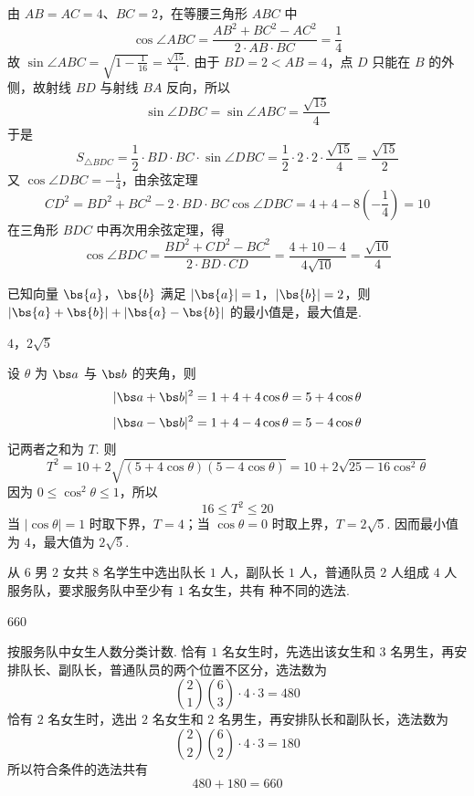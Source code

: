 \begin{solution}
由 \(AB=AC=4\)、\(BC=2\)，在等腰三角形 \(ABC\) 中
\[
\cos\angle ABC=\frac{AB^2+BC^2-AC^2}{2\cdot AB\cdot BC}=\frac14
\]
故 \(\sin\angle ABC=\sqrt{1-\frac{1}{16}}=\frac{\sqrt{15}}{4}\). 由于 \(BD=2<AB=4\)，点 \(D\) 只能在 \(B\) 的外侧，故射线 \(BD\) 与射线 \(BA\) 反向，所以
\[
\sin\angle DBC=\sin\angle ABC=\frac{\sqrt{15}}4
\]
于是
\[
S_{\triangle BDC}=\frac12\cdot BD\cdot BC\cdot\sin\angle DBC
=\frac12\cdot2\cdot2\cdot\frac{\sqrt{15}}4=\frac{\sqrt{15}}2
\]
又 \(\cos\angle DBC=-\frac{1}{4}\)，由余弦定理
\[
CD^2=BD^2+BC^2-2\cdot BD\cdot BC\cos\angle DBC
=4+4-8\left(-\frac14\right)=10
\]
在三角形 \(BDC\) 中再次用余弦定理，得
\[
\cos\angle BDC=\frac{BD^2+CD^2-BC^2}{2\cdot BD\cdot CD}
=\frac{4+10-4}{4\sqrt{10}}=\frac{\sqrt{10}}4
\]
\end{solution}

\begin{problem}
已知向量 \(\bs{a}\)，\(\bs{b}\) 满足 \(|\bs{a}|=1\)，\(|\bs{b}|=2\)，则 \(|\bs{a}+\bs{b}|+|\bs{a}-\bs{b}|\) 的最小值是\fillinblank{}，最大值是\fillinblank{}.
\end{problem}

\begin{answer}
\(4\)，\(2\sqrt{5}\)
\end{answer}

\begin{solution}
设 \(\theta\) 为 \(\bs a\) 与 \(\bs b\) 的夹角，则
\[
|\bs a+\bs b|^2=1+4+4\cos\theta=5+4\cos\theta
\]
\[
|\bs a-\bs b|^2=1+4-4\cos\theta=5-4\cos\theta
\]
记两者之和为 \(T\). 则
\[
T^2=10+2\sqrt{(5+4\cos\theta)(5-4\cos\theta)}
=10+2\sqrt{25-16\cos^2\theta}
\]
因为 \(0\leq\cos^2\theta\leq1\)，所以
\[
16\leq T^2\leq20
\]
当 \(|\cos\theta|=1\) 时取下界，\(T=4\)；当 \(\cos\theta=0\) 时取上界，\(T=2\sqrt5\). 因而最小值为 \(4\)，最大值为 \(2\sqrt5\).
\end{solution}

\begin{problem}
从 \(6\) 男 \(2\) 女共 \(8\) 名学生中选出队长 \(1\) 人，副队长 \(1\) 人，普通队员 \(2\) 人组成 \(4\) 人服务队，要求服务队中至少有 \(1\) 名女生，共有\fillinblank{} 种不同的选法.
\end{problem}

\begin{answer}
\(660\)
\end{answer}

\begin{solution}
按服务队中女生人数分类计数. 恰有 \(1\) 名女生时，先选出该女生和 \(3\) 名男生，再安排队长、副队长，普通队员的两个位置不区分，选法数为
\[
\binom21\binom63\cdot4\cdot3=480
\]
恰有 \(2\) 名女生时，选出 \(2\) 名女生和 \(2\) 名男生，再安排队长和副队长，选法数为
\[
\binom22\binom62\cdot4\cdot3=180
\]
所以符合条件的选法共有
\[
480+180=660
\]
\end{solution}

